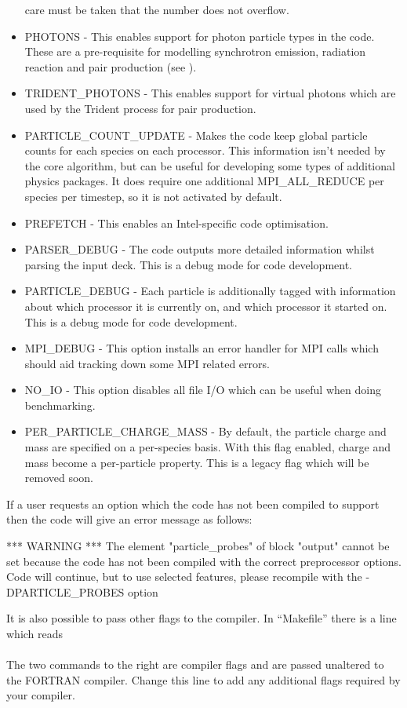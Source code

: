 \begin{itemize}
  care must be taken that the number does not overflow.
\item PHOTONS - This enables support for photon particle types in the code.
  These are a pre-requisite for modelling synchrotron emission, radiation
  reaction and pair production (see ).
\item TRIDENT\_PHOTONS - This enables support for virtual photons which are
  used by the Trident process for pair production.
\item PARTICLE\_COUNT\_UPDATE - Makes the code keep global particle counts for
  each species on each processor. This information isn't needed by the core
  algorithm, but can be useful for developing some types of additional physics
  packages. It does require one additional MPI\_ALL\_REDUCE per species per
  timestep, so it is not activated by default.
\item PREFETCH - This enables an Intel-specific code optimisation.
\item PARSER\_DEBUG - The code outputs more detailed information whilst
  parsing the input deck. This is a debug mode for code development.
\item PARTICLE\_DEBUG - Each particle is additionally tagged with information
  about which processor it is currently on, and which processor it started
  on. This is a debug mode for code development.
\item MPI\_DEBUG - This option installs an error handler for MPI calls which
  should aid tracking down some MPI related errors.
\item NO\_IO - This option disables all file I/O which can be useful when
  doing benchmarking.
\item PER\_PARTICLE\_CHARGE\_MASS - By default, the particle charge and
  mass are specified on a per-species basis. With this flag enabled, charge
  and mass become a per-particle property. This is a legacy flag which will
  be removed soon.
\end{itemize}

If a user requests an option which the code has not been compiled to support
then the code will give an error message as follows:
\begin{boxverbatim}
 *** WARNING ***
 The element "particle_probes" of block "output" cannot be set
 because the code has not been compiled with the correct preprocessor options.
 Code will continue, but to use selected features, please recompile with the
 -DPARTICLE_PROBES option
\end{boxverbatim}
It is also possible to pass other flags to the compiler. In ``Makefile'' there
is a line which reads\\
\indent{}\\
The two commands to the right are compiler flags and are passed unaltered to
the FORTRAN compiler. Change this line to add any additional flags required by
your compiler.

